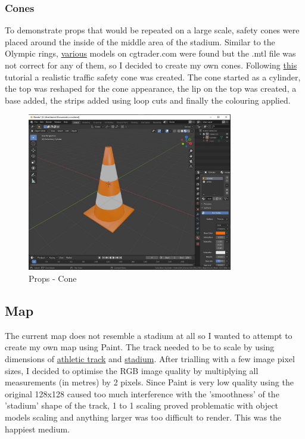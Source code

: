 \documentclass[a4 paper, 12pt]{article}
\begin{document}
\subsubsection{Cones}
To demonstrate props that would be repeated on a large scale, safety cones were placed around the inside of the middle area of the stadium. Similar to the Olympic rings, \href{https://www.cgtrader.com/free-3d-models/exterior/street/cone-2b4a9172-7afb-4611-8e23-bdac1afe0b87}{various} models on cgtrader.com were found but the .mtl file was not correct for any of them, so I decided to create my own cones. Following \href{https://www.youtube.com/watch?v=vQ_1HU_-BJM}{this} tutorial a realistic traffic safety cone was created. The cone started as a cylinder, the top was reshaped for the cone appearance, the lip on the top was created, a base added, the strips added using loop cuts and finally the colouring applied.
    \begin{figure} [H]
        \centering
        \includegraphics[width=0.8\textwidth, frame]
            {./images/olympics/cone_blend.jpg}
        \caption{Props - Cone}   
    \end{figure}

\subsection{Map}
The current map does not resemble a stadium at all so I wanted to attempt to create my own map using Paint. The track needed to be to scale by using dimensions of \href{https://www.dimensions.guide/element/track-and-field-400m-running-track}{athletic track} and \href{https://hypertextbook.com/facts/2006/JamesKim.shtml}{stadium}. After trialling with a few image pixel sizes, I decided to optimise the RGB image quality by multiplying all measurements (in metres) by 2 pixels. Since Paint is very low quality using the original 128x128 caused too much interference with the 'smoothness' of the 'stadium' shape of the track, 1 to 1 scaling proved problematic with object models scaling and anything larger was too difficult to render. This was the happiest medium.
 
\end{document}
